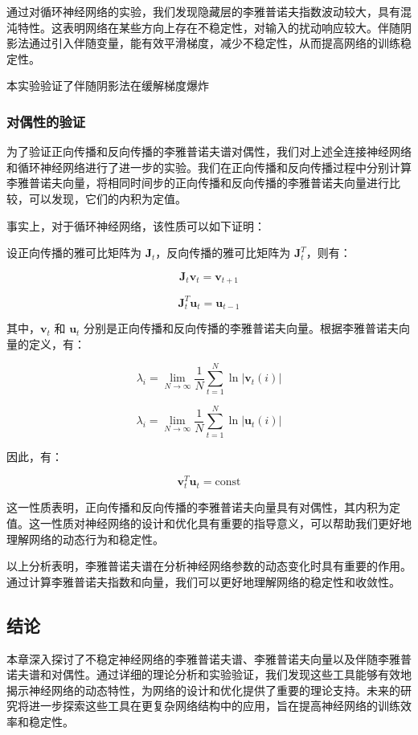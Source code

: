 \documentclass[12pt,a4paper]{amsart}
\begin{document}
通过对循环神经网络的实验，我们发现隐藏层的李雅普诺夫指数波动较大，具有混沌特性。这表明网络在某些方向上存在不稳定性，对输入的扰动响应较大。伴随阴影法通过引入伴随变量，能有效平滑梯度，减少不稳定性，从而提高网络的训练稳定性。

本实验验证了伴随阴影法在缓解梯度爆炸

\subsubsection{对偶性的验证}

为了验证正向传播和反向传播的李雅普诺夫谱对偶性，我们对上述全连接神经网络和循环神经网络进行了进一步的实验。我们在正向传播和反向传播过程中分别计算李雅普诺夫向量，将相同时间步的正向传播和反向传播的李雅普诺夫向量进行比较，可以发现，它们的内积为定值。

事实上，对于循环神经网络，该性质可以如下证明：

设正向传播的雅可比矩阵为 \(\mathbf{J}_t\)，反向传播的雅可比矩阵为 \(\mathbf{J}_t^T\)，则有：

\[
\mathbf{J}_t \mathbf{v}_t = \mathbf{v}_{t+1}
\]

\[
\mathbf{J}_t^T \mathbf{u}_t = \mathbf{u}_{t-1}
\]

其中，\(\mathbf{v}_t\) 和 \(\mathbf{u}_t\) 分别是正向传播和反向传播的李雅普诺夫向量。根据李雅普诺夫向量的定义，有：

\[
\lambda_i = \lim_{N \to \infty} \frac{1}{N} \sum_{t=1}^N \ln |\mathbf{v}_t(i)|
\]

\[
\lambda_i = \lim_{N \to \infty} \frac{1}{N} \sum_{t=1}^N \ln |\mathbf{u}_t(i)|
\]

因此，有：

\[
\mathbf{v}_t^T \mathbf{u}_t = \text{const}
\]

这一性质表明，正向传播和反向传播的李雅普诺夫向量具有对偶性，其内积为定值。这一性质对神经网络的设计和优化具有重要的指导意义，可以帮助我们更好地理解网络的动态行为和稳定性。

以上分析表明，李雅普诺夫谱在分析神经网络参数的动态变化时具有重要的作用。通过计算李雅普诺夫指数和向量，我们可以更好地理解网络的稳定性和收敛性。

\subsection{结论}

本章深入探讨了不稳定神经网络的李雅普诺夫谱、李雅普诺夫向量以及伴随李雅普诺夫谱和对偶性。通过详细的理论分析和实验验证，我们发现这些工具能够有效地揭示神经网络的动态特性，为网络的设计和优化提供了重要的理论支持。未来的研究将进一步探索这些工具在更复杂网络结构中的应用，旨在提高神经网络的训练效率和稳定性。
\end{document}
